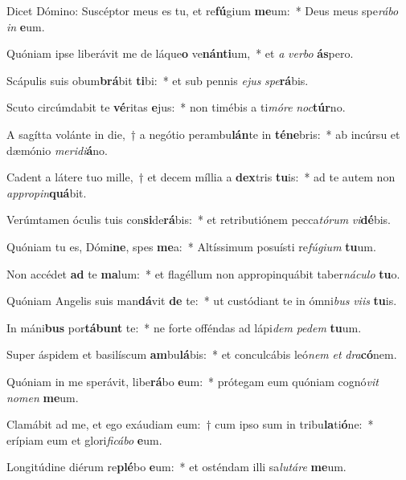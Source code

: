 \item Dicet Dómino: Suscéptor meus es tu, et re\textbf{fú}gium \textbf{me}um:~* Deus meus spe\textit{rá}\textit{bo} \textit{in} \textbf{e}um.
\item Quóniam ipse liberávit me de láque\textbf{o} ve\textbf{nán}\textbf{ti}um,~* et \textit{a} \textit{ver}\textit{bo} \textbf{ás}pero.
\item Scápulis suis obum\textbf{brá}bit \textbf{ti}bi:~* et sub pennis \textit{e}\textit{jus} \textit{spe}\textbf{rá}bis.
\item Scuto circúmdabit te \textbf{vé}ritas \textbf{e}jus:~* non timébis a ti\textit{mó}\textit{re} \textit{noc}\textbf{túr}no.
\item A sagítta volánte in die,~† a negótio perambu\textbf{lán}te in \textbf{té}\textbf{ne}bris:~* ab incúrsu et dæmónio \textit{me}\textit{ri}\textit{di}\textbf{á}no.
\item Cadent a látere tuo mille,~† et decem míllia a \textbf{dex}tris \textbf{tu}is:~* ad te autem non \textit{ap}\textit{pro}\textit{pin}\textbf{quá}bit.
\item Verúmtamen óculis tuis con\textbf{si}de\textbf{rá}bis:~* et retributiónem pecca\textit{tó}\textit{rum} \textit{vi}\textbf{dé}bis.
\item Quóniam tu es, Dómi\textbf{ne}, spes \textbf{me}a:~* Altíssimum posuísti re\textit{fú}\textit{gi}\textit{um} \textbf{tu}um.
\item Non accédet \textbf{ad} te \textbf{ma}lum:~* et flagéllum non appropinquábit taber\textit{ná}\textit{cu}\textit{lo} \textbf{tu}o.
\item Quóniam Angelis suis man\textbf{dá}vit \textbf{de} te:~* ut custódiant te in ómni\textit{bus} \textit{vi}\textit{is} \textbf{tu}is.
\item In máni\textbf{bus} por\textbf{tá}\textbf{bunt} te:~* ne forte offéndas ad lápi\textit{dem} \textit{pe}\textit{dem} \textbf{tu}um.
\item Super áspidem et basilíscum \textbf{am}bu\textbf{lá}bis:~* et conculcábis leó\textit{nem} \textit{et} \textit{dra}\textbf{có}nem.
\item Quóniam in me sperávit, libe\textbf{rá}bo \textbf{e}um:~* prótegam eum quóniam cognó\textit{vit} \textit{no}\textit{men} \textbf{me}um.
\item Clamábit ad me, et ego exáudiam eum:~† cum ipso sum in tribu\textbf{la}ti\textbf{ó}ne:~* erípiam eum et glori\textit{fi}\textit{cá}\textit{bo} \textbf{e}um.
\item Longitúdine diérum re\textbf{plé}bo \textbf{e}um:~* et osténdam illi sa\textit{lu}\textit{tá}\textit{re} \textbf{me}um.
